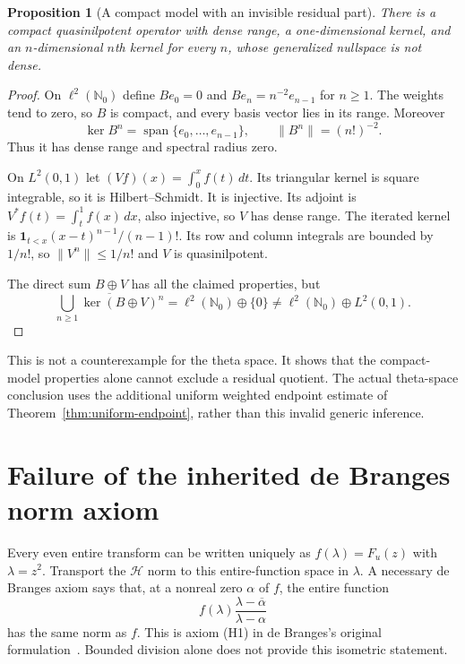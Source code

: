 \documentclass[11pt,a4paper]{article}
\numberwithin{equation}{section}
\newtheorem{proposition}[theorem]{Proposition}
\theoremstyle{definition}
\theoremstyle{remark}
\newcommand{\Hh}{\mathcal H}
\newcommand{\norm}[1]{\lVert #1\rVert}
\begin{document}
\begin{proposition}[A compact model with an invisible residual part]\label{prop:countermodel}
There is a compact quasinilpotent operator with dense range, a one-dimensional kernel, and an $n$-dimensional $n$th kernel for every $n$, whose generalized nullspace is not dense.
\end{proposition}
\begin{proof}
On $\ell^2(\mathbb N_0)$ define $Be_0=0$ and $Be_n=n^{-2}e_{n-1}$ for $n\ge1$. The weights tend to zero, so $B$ is compact, and every basis vector lies in its range. Moreover
\[
 \ker B^n=\operatorname{span}\{e_0,\ldots,e_{n-1}\},\qquad
 \norm{B^n}=(n!)^{-2}.
\]
Thus it has dense range and spectral radius zero.

On $L^2(0,1)$ let $(Vf)(x)=\int_0^x f(t)\,dt$. Its triangular kernel is square integrable, so it is Hilbert--Schmidt. It is injective. Its adjoint is $V^*f(t)=\int_t^1f(x)\,dx$, also injective, so $V$ has dense range. The iterated kernel is
$\boldsymbol1_{t<x}(x-t)^{n-1}/(n-1)!$. Its row and column integrals are bounded by $1/n!$, so $\norm{V^n}\le1/n!$ and $V$ is quasinilpotent.

The direct sum $B\oplus V$ has all the claimed properties, but
\[
 \overline{\bigcup_{n\ge1}\ker(B\oplus V)^n}
 =\ell^2(\mathbb N_0)\oplus\{0\}
 \ne\ell^2(\mathbb N_0)\oplus L^2(0,1).
\]
\end{proof}

This is not a counterexample for the theta space. It shows that the compact-model properties alone cannot exclude a residual quotient. The actual theta-space conclusion uses the additional uniform weighted endpoint estimate of Theorem~\ref{thm:uniform-endpoint}, rather than this invalid generic inference.

\section{Failure of the inherited de Branges norm axiom}\label{sec:debranges}

Every even entire transform can be written uniquely as $f(\lambda)=F_u(z)$ with $\lambda=z^2$. Transport the $\Hh$ norm to this entire-function space in $\lambda$. A necessary de Branges axiom says that, at a nonreal zero $\alpha$ of $f$, the entire function
\begin{equation}\label{eq:zero-flip}
 f(\lambda)\frac{\lambda-\overline\alpha}{\lambda-\alpha}
\end{equation}
has the same norm as $f$. This is axiom (H1) in de Branges's original formulation~\cite{deBranges1961}. Bounded division alone does not provide this isometric statement.
\end{document}
